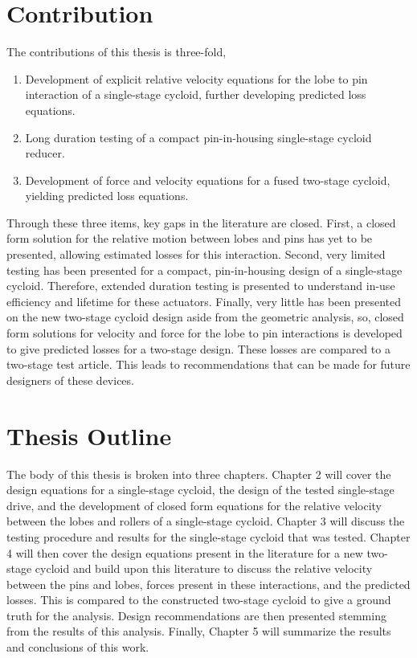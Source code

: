 \section{Contribution} \label{intro:contribution}

The contributions of this thesis is three-fold,
\begin{enumerate}
	\item Development of explicit relative velocity equations for the lobe to pin interaction of a single-stage cycloid, further developing predicted loss equations.
	\item Long duration testing of a compact pin-in-housing single-stage cycloid reducer.
	\item Development of force and velocity equations for a fused two-stage cycloid, yielding predicted loss equations. 
\end{enumerate}
Through these three items, key gaps in the literature are closed. First, a closed form solution for the relative motion between lobes and pins has yet to be presented, allowing estimated losses for this interaction. Second, very limited testing has been presented for a compact, pin-in-housing design of a single-stage cycloid. Therefore, extended duration testing is presented to understand in-use efficiency and lifetime for these actuators. Finally, very little has been presented on the new two-stage cycloid design aside from the geometric analysis, so, closed form solutions for velocity and force for the lobe to pin interactions is developed to give predicted losses for a two-stage design. These losses are compared to a two-stage test article. This leads to recommendations that can be made for future designers of these devices. 

\section{Thesis Outline} \label{intro:outline}
The body of this thesis is broken into three chapters. Chapter 2 will cover the design equations for a single-stage cycloid, the design of the tested single-stage drive, and the development of closed form equations for the relative velocity between the lobes and rollers of a single-stage cycloid. Chapter 3 will discuss the testing procedure and results for the single-stage cycloid that was tested. Chapter 4 will then cover the design equations present in the literature for a new two-stage cycloid and build upon this literature to discuss the relative velocity between the pins and lobes, forces present in these interactions, and the predicted losses. This is compared to the constructed two-stage cycloid to give a ground truth for the analysis. Design recommendations are then presented stemming from the results of this analysis. Finally, Chapter 5 will summarize the results and conclusions of this work. 

